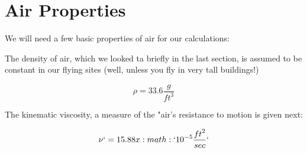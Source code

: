 \section{Air Properties}

We will need a few basic properties of air for our calculations:

The density of air, which we looked ta briefly in the last section, is assumed
to be constant in our flying sites (well, unless you fly in very tall
buildings!)


\begin{equation}
    \rho = 33.6 \frac{g}{{ft}^3}
\end{equation}

The kinematic viscosity, a measure of the "air's resistance to motion is given
next:

\begin{equation}
    \nu` = 15.88 x :math:`10^{-5}\frac{{ft}^2}{sec}`
\end{equation}
